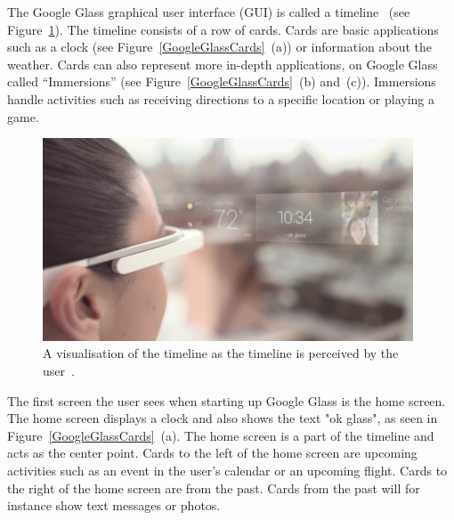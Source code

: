 The Google Glass graphical user interface (GUI) is called a timeline~\cite{ImagesGoogleGlassUI} (see Figure~\ref{GoogleGlassUI}). The timeline consists of a row of cards. Cards are basic applications such as a clock (see Figure~\ref{GoogleGlassCards}~(a)) or information about the weather. Cards can also represent more in-depth applications, on Google Glass called ``Immersions'' (see Figure~\ref{GoogleGlassCards}~(b) and~(c)). Immersions handle activities such as receiving directions to a specific location or playing a game.

	\begin{figure}[ht!]
		\centering
		\includegraphics[width=110mm]{images/GoogleGlassUI}
		\caption{A visualisation of the timeline as the timeline is perceived by the user~\cite{ImagesGoogleGlassUI}.}
		\label{GoogleGlassUI}
	\end{figure}

The first screen the user sees when starting up Google Glass is the home screen. The home screen displays a clock and also shows the text "ok glass", as seen in Figure~\ref{GoogleGlassCards}~(a). The home screen is a part of the timeline and acts as the center point. Cards to the left of the home screen are upcoming activities such as an event in the user's calendar or an upcoming flight. Cards to the right of the home screen are from the past. Cards from the past will for instance show text messages or photos.

